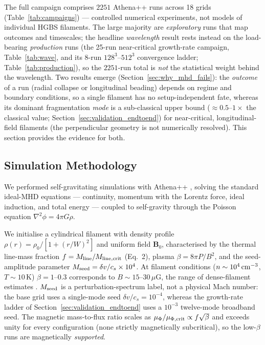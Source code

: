 \documentclass[usenatbib,twoside,twocolumn]{mnras}
\begin{document}
The full campaign comprises $2251$ Athena++ runs across 18 grids (Table~\ref{tab:campaigns}) --- controlled numerical experiments, not models of individual HGBS filaments. The large majority are \emph{exploratory} runs that map outcomes and timescales; the headline \emph{wavelength} result rests instead on the load-bearing \emph{production} runs (the 25-run near-critical growth-rate campaign, Table~\ref{tab:wave}, and its 8-run $128^3$--$512^3$ convergence ladder; Table~\ref{tab:production}), so the $2251$-run total is \emph{not} the statistical weight behind the wavelength. Two results emerge (Section~\ref{sec:why_mhd_fails}): the \emph{outcome} of a run (radial collapse or longitudinal beading) depends on regime and boundary conditions, so a single filament has no setup-independent fate, whereas its dominant fragmentation \emph{mode} is a sub-classical upper bound ($\approx0.5$--$1\times$ the classical value; Section~\ref{sec:validation_endtoend}) for near-critical, longitudinal-field filaments (the perpendicular geometry is not numerically resolved). This section provides the evidence for both.

\subsection{Simulation Methodology}

We performed self-gravitating simulations with Athena++ \citep{Stone2020}, solving the standard ideal-MHD equations --- continuity, momentum with the Lorentz force, ideal induction, and total energy --- coupled to self-gravity through the Poisson equation $\nabla^2\phi=4\pi G\rho$.

We initialise a cylindrical filament with density profile $\rho(r)=\rho_0/[1+(r/W)^2]$ and uniform field $\mathbf{B}_0$, characterised by the thermal line-mass fraction $f=M_{\rm line}/M_{\rm line,crit}$ (Eq.~2), plasma $\beta=8\pi P/B^2$, and the seed-amplitude parameter $M_{\rm seed}=\delta v/c_s\times10^{4}$. At filament conditions ($n\sim10^4\,{\rm cm^{-3}}$, $T\sim10$\,K) $\beta=1$--$0.3$ corresponds to $B\sim15$--$30\,\mu$G, the range of dense-filament estimates \citep{Crutcher2012}. $M_{\rm seed}$ is a perturbation-spectrum label, not a physical Mach number: the base grid uses a single-mode seed $\delta v/c_s=10^{-4}$, whereas the growth-rate ladder of Section~\ref{sec:validation_endtoend} uses a $10^{-3}$ twelve-mode broadband seed. The magnetic mass-to-flux ratio scales as $\mu_\Phi/\mu_{\Phi,\rm crit}\propto f\sqrt{\beta}$ and exceeds unity for every configuration (none strictly magnetically subcritical), so the low-$\beta$ runs are magnetically \emph{supported}.
\end{document}

